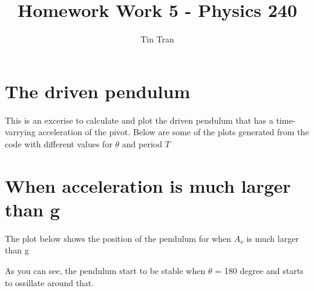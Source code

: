 \documentclass{article}
\begin{document}
\title{Homework Work 5 - Physics 240}
\author{Tin Tran}

\maketitle

\section{The driven pendulum}

This is an excerise to calculate and plot the driven pendulum that has a time-varrying acceleration of the pivot. Below are some of the plots generated from the code with different values for $\theta$ and period $T$

\begin{figure}[H]
\end{figure}



\section{When acceleration is much larger than g}
The plot below shows the position of the pendulum for when $A_o$ is much larger than g
\begin{figure}[H]
\end{figure}
\noindent As you can see, the pendulum start to be stable when $\theta$ = 180 degree and starts to ossillate around that.\\
\end{document}
